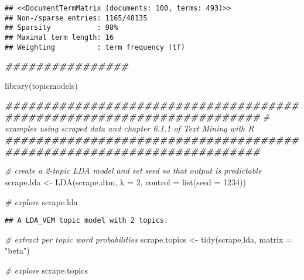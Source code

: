 \documentclass[
]{article}
\newenvironment{Shaded}{\begin{snugshade}}{\end{snugshade}}
\newcommand{\AttributeTok}[1]{\textcolor[rgb]{0.77,0.63,0.00}{#1}}
\newcommand{\CommentTok}[1]{\textcolor[rgb]{0.56,0.35,0.01}{\textit{#1}}}
\newcommand{\DecValTok}[1]{\textcolor[rgb]{0.00,0.00,0.81}{#1}}
\newcommand{\DocumentationTok}[1]{\textcolor[rgb]{0.56,0.35,0.01}{\textbf{\textit{#1}}}}
\newcommand{\FunctionTok}[1]{\textcolor[rgb]{0.00,0.00,0.00}{#1}}
\newcommand{\NormalTok}[1]{#1}
\newcommand{\OtherTok}[1]{\textcolor[rgb]{0.56,0.35,0.01}{#1}}
\newcommand{\StringTok}[1]{\textcolor[rgb]{0.31,0.60,0.02}{#1}}
\begin{document}
\begin{verbatim}
## <<DocumentTermMatrix (documents: 100, terms: 493)>>
## Non-/sparse entries: 1165/48135
## Sparsity           : 98%
## Maximal term length: 16
## Weighting          : term frequency (tf)
\end{verbatim}

\begin{Shaded}
\begin{Highlighting}[]
\DocumentationTok{\#\#\#\#\#\#\#\#\#\#\#\#\#\#\#\#}
\end{Highlighting}
\end{Shaded}

\begin{Shaded}
\begin{Highlighting}[]
\FunctionTok{library}\NormalTok{(topicmodels)}

\DocumentationTok{\#\#\#\#\#\#\#\#\#\#\#\#\#\#\#\#\#\#\#\#\#\#\#\#\#\#\#\#\#\#\#\#\#\#\#\#\#\#\#\#\#\#\#\#\#\#\#\#\#\#\#\#\#\#\#\#\#\#\#\#\#\#\#\#\#\#\#\#\#\#\#}
\CommentTok{\# examples using scraped data and chapter 6.1.1 of Text Mining with R}
\DocumentationTok{\#\#\#\#\#\#\#\#\#\#\#\#\#\#\#\#\#\#\#\#\#\#\#\#\#\#\#\#\#\#\#\#\#\#\#\#\#\#\#\#\#\#\#\#\#\#\#\#\#\#\#\#\#\#\#\#\#\#\#\#\#\#\#\#\#\#\#\#\#\#\#}

\CommentTok{\# create a 2{-}topic LDA model and set seed so that output is predictable}
\NormalTok{scrape.lda }\OtherTok{\textless{}{-}} \FunctionTok{LDA}\NormalTok{(scrape.dtm, }\AttributeTok{k =} \DecValTok{2}\NormalTok{, }\AttributeTok{control =} \FunctionTok{list}\NormalTok{(}\AttributeTok{seed =} \DecValTok{1234}\NormalTok{))}

\CommentTok{\# explore}
\NormalTok{scrape.lda}
\end{Highlighting}
\end{Shaded}

\begin{verbatim}
## A LDA_VEM topic model with 2 topics.
\end{verbatim}

\begin{Shaded}
\begin{Highlighting}[]
\CommentTok{\# extract per topic word probabilities}
\NormalTok{scrape.topics }\OtherTok{\textless{}{-}} \FunctionTok{tidy}\NormalTok{(scrape.lda, }\AttributeTok{matrix =} \StringTok{"beta"}\NormalTok{)}

\CommentTok{\# explore}
\NormalTok{scrape.topics}
\end{Highlighting}
\end{Shaded}
\end{document}
